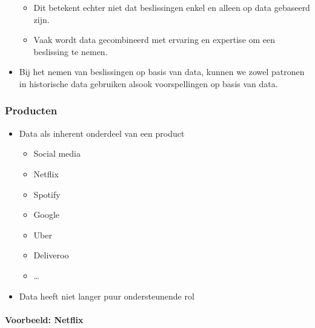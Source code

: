 \documentclass[]{tufte-book}
\providecommand{\tightlist}{%
  \setlength{\itemsep}{0pt}\setlength{\parskip}{0pt}}
\begin{document}
\begin{itemize}
  \begin{itemize}
  \tightlist
  \item
    Dit betekent echter niet dat beslissingen enkel en alleen op data gebaseerd zijn.
  \item
    Vaak wordt data gecombineerd met ervaring en expertise om een beslissing te nemen.
  \end{itemize}
\item
  Bij het nemen van beslissingen op basis van data, kunnen we zowel patronen in historische data gebruiken alsook voorspellingen op basis van data.
\end{itemize}

\hypertarget{producten}{%
\subsubsection*{Producten}\label{producten}}

\begin{itemize}
\tightlist
\item
  Data als inherent onderdeel van een product

  \begin{itemize}
  \tightlist
  \item
    Social media
  \item
    Netflix
  \item
    Spotify
  \item
    Google
  \item
    Uber
  \item
    Deliveroo
  \item
    \ldots{}
  \end{itemize}
\item
  Data heeft niet langer puur ondersteunende rol
\end{itemize}

\hypertarget{voorbeeld-netflix}{%
\paragraph{Voorbeeld: Netflix}\label{voorbeeld-netflix}}
\end{document}
